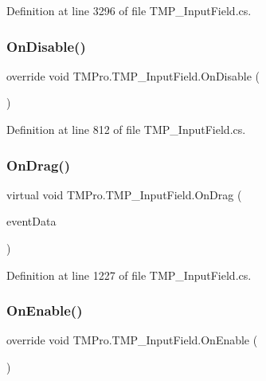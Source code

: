 Definition at line 3296 of file T\+M\+P\+\_\+\+Input\+Field.\+cs.

\mbox{\label{class_t_m_pro_1_1_t_m_p___input_field_ae84831aa9c5d44a1ca91685d772b44d4}} 
\subsubsection{\texorpdfstring{OnDisable()}{OnDisable()}}
{\footnotesize\ttfamily override void T\+M\+Pro.\+T\+M\+P\+\_\+\+Input\+Field.\+On\+Disable (\begin{DoxyParamCaption}{ }\end{DoxyParamCaption})\hspace{0.3cm}{\ttfamily [protected]}}



Definition at line 812 of file T\+M\+P\+\_\+\+Input\+Field.\+cs.

\mbox{\label{class_t_m_pro_1_1_t_m_p___input_field_ad670bf0eee71dbabbe95948062a0fea2}} 
\subsubsection{\texorpdfstring{OnDrag()}{OnDrag()}}
{\footnotesize\ttfamily virtual void T\+M\+Pro.\+T\+M\+P\+\_\+\+Input\+Field.\+On\+Drag (\begin{DoxyParamCaption}\item[{Pointer\+Event\+Data}]{event\+Data }\end{DoxyParamCaption})\hspace{0.3cm}{\ttfamily [virtual]}}



Definition at line 1227 of file T\+M\+P\+\_\+\+Input\+Field.\+cs.

\mbox{\label{class_t_m_pro_1_1_t_m_p___input_field_ad2ff861cc6eb60e636a7dc4cb8280437}} 
\subsubsection{\texorpdfstring{OnEnable()}{OnEnable()}}
{\footnotesize\ttfamily override void T\+M\+Pro.\+T\+M\+P\+\_\+\+Input\+Field.\+On\+Enable (\begin{DoxyParamCaption}{ }\end{DoxyParamCaption})\hspace{0.3cm}{\ttfamily [protected]}}




